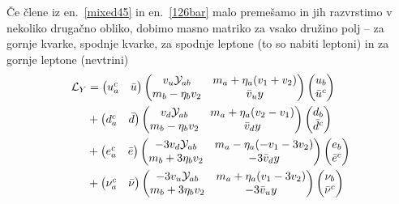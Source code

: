 Če člene iz en.~\eqref{mixed45} in en.~\eqref{126bar} malo premešamo in jih razvrstimo v nekoliko
drugačno obliko, dobimo masno matriko za vsako družino polj -- za gornje kvarke, spodnje kvarke, za
spodnje leptone (to so nabiti leptoni) in za gornje leptone (nevtrini)
\begin{align}
	\mathcal{L}_Y &= \begin{pmatrix}
		u^c_a & \bar{u}
	\end{pmatrix} \begin{pmatrix}
		v_u \mathcal{Y}_{ab} & m_a + \eta_a(v_1 + v_2) \\
		m_b - \eta_b v_2 & \bar{v}_u y
	\end{pmatrix} \begin{pmatrix}
		u_b \\ \bar{u}^c
	\end{pmatrix} \notag \\
	&+ \begin{pmatrix}
		d^c_a & \bar{d}
	\end{pmatrix} \begin{pmatrix}
		v_d \mathcal{Y}_{ab} & m_a + \eta_a(v_2 - v_1) \\
		m_b - \eta_b v_2 & \bar{v}_d y
	\end{pmatrix} \begin{pmatrix}
		d_b \\ \bar{d}^c
	\end{pmatrix} \notag \\
	&+ \begin{pmatrix}
		e_a^c & \bar{e}
	\end{pmatrix} \begin{pmatrix}
		-3v_d \mathcal{Y}_{ab} & m_a - \eta_a(-v_1 - 3v_2) \\
		m_b + 3 \eta_b v_2 & -3\bar{v}_d y
	\end{pmatrix} \begin{pmatrix}
		e_b \\ \bar{e}^c
	\end{pmatrix} \notag \\
	&+ \begin{pmatrix}
		\nu^c_a & \bar{\nu}
	\end{pmatrix} \begin{pmatrix}
		-3 v_u \mathcal{Y}_{ab} & m_a + \eta_a(v_1 - 3v_2) \\
		m_b + 3 \eta_b v_2 & -3\bar{v}_u y
	\end{pmatrix} \begin{pmatrix}
		\nu_b \\ \bar{\nu}^c

\end{pmatrix}
\end{align}
